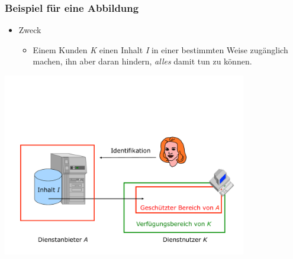 \documentclass[t]{beamer}
\begin{document}
\begin{frame}
	\transwipe %
	\frametitle{Beispiel für eine Abbildung}
	\begin{itemize}
		\item Zweck
			\begin{itemize}
				\item Einem Kunden \emph{\color[RGB]{0,128,0} K} einen Inhalt \emph{\color{red} I} in einer bestimmten Weise zugänglich machen, ihn aber daran hindern, \emph{alles} damit tun zu können.
			\end{itemize}
	\end{itemize}
	\vspace{\fill}
	\begin{center}
		\includegraphics[width=0.8\textwidth]{pic/abbildung2.pdf}
	\end{center}
\end{frame}
\end{document}
